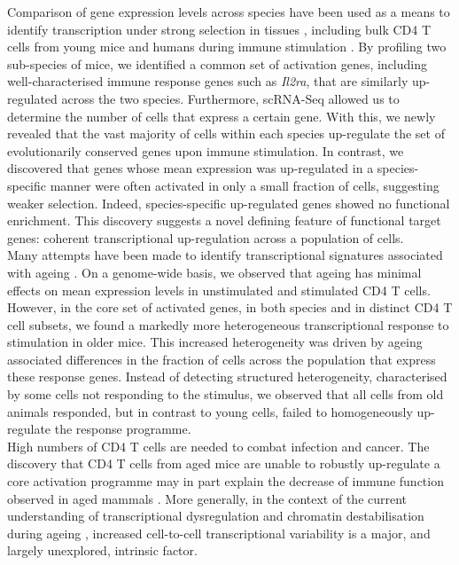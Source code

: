 Comparison of gene expression levels across species have been used as a means to identify transcription under strong selection in tissues \citep{Sudmant2015, Brawand2011, Romero2012, Barbosa-Morais2012, Perry2012}, including bulk CD4\plus{} T cells from young mice and humans during immune stimulation \citep{Shay2013}. 
By profiling two sub-species of mice, we identified a common set of activation genes, including well-characterised immune response genes such as \textit{Il2ra}, that are similarly up-regulated across the two species. 
Furthermore, scRNA-Seq allowed us to determine the number of cells that express a certain gene. 
With this, we newly revealed that the vast majority of cells within each species up-regulate the set of evolutionarily conserved genes upon immune stimulation. 
In contrast, we discovered that genes whose mean expression was up-regulated in a species-specific manner were often activated in only a small fraction of cells, suggesting weaker selection. 
Indeed, species-specific up-regulated genes showed no functional enrichment. 
This discovery suggests a novel defining feature of functional target genes: coherent transcriptional up-regulation across a population of cells. \\

Many attempts have been made to identify transcriptional signatures associated with ageing \citep{DeMagalhaes2009, Magalhaes2009, Chen2013, Kowalczyk2015}. 
On a genome-wide basis, we observed that ageing has minimal effects on mean expression levels in unstimulated and stimulated CD4\plus{} T cells. 
However, in the core set of activated genes, in both species and in distinct CD4\plus{} T cell subsets, we found a markedly more heterogeneous transcriptional response to stimulation in older mice. 
This increased heterogeneity was driven by ageing associated differences in the fraction of cells across the population that express these response genes. 
Instead of detecting structured heterogeneity, characterised by some cells not responding to the stimulus, we observed that all cells from old animals responded, but in contrast to young cells, failed to homogeneously up-regulate the response programme. \\

High numbers of CD4\plus{} T cells are needed to combat infection and cancer. 
The discovery that CD4\plus{} T cells from aged mice are unable to robustly up-regulate a core activation programme may in part explain the decrease of immune function observed in aged mammals \citep{Goronzy2013, Nikolich-Zugich2018}. 
More generally, in the context of the current understanding of transcriptional dysregulation and chromatin destabilisation during ageing \citep{Booth2016}, increased cell-to-cell transcriptional variability is a major, and largely unexplored, intrinsic factor.\\

